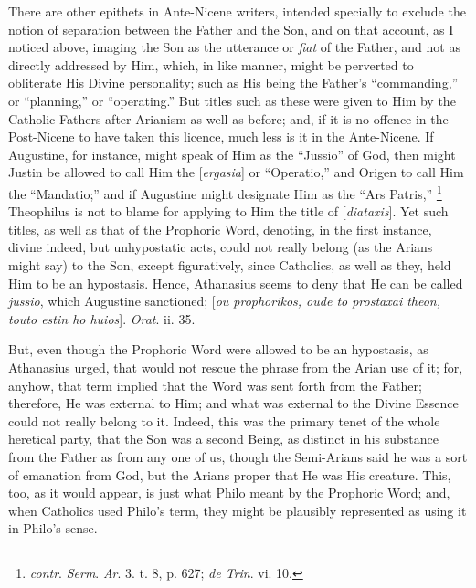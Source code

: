 There are other epithets in Ante-Nicene writers, intended specially
to exclude the notion of separation between the Father and the Son,
and on that account, as I noticed above, imaging the Son as the
utterance or \emph{fiat} of the Father, and not as directly addressed
by Him, which, in like manner, might be perverted to obliterate His
Divine personality; such as His being the Father's
``commanding,'' or ``planning,'' or
``operating.'' But titles such as these were given to Him by
the Catholic Fathers after Arianism as well as before; and, if it is
no offence in the Post-Nicene to have taken this licence, much less is
it in the Ante-Nicene. If Augustine, for instance, might speak of Him
as the ``Jussio'' of God, then might Justin be allowed to call
Him the [\emph{ergasia}] or ``Operatio,'' and Origen to call
Him the ``Mandatio;'' and if Augustine might designate Him as
the ``Ars Patris,'' \footnote{\emph{contr}. \emph{Serm}.
\emph{Ar}. 3. t. 8, p. 627; \emph{de Trin}. vi. 10.}
Theophilus is not to blame for applying to Him the title of [\emph{diataxis}].
Yet such titles, as well as that of the Prophoric Word, denoting, in
the first instance, divine indeed, but unhypostatic acts, could not
really belong (as the Arians might say) to the Son, except
figuratively, since Catholics, as well as they, held Him to be an
hypostasis. Hence, Athanasius seems to deny that He can be called \emph{jussio},
which Augustine sanctioned; [\emph{ou prophorikos, oude to prostaxai
theon, touto estin ho huios}]. \emph{Orat}. ii. 35.

But, even though the Prophoric Word were allowed to be an
hypostasis, as Athanasius urged, that would not rescue the phrase from
the Arian use of it; for, anyhow, that term implied that the Word was
sent forth from the Father; therefore, He was external to Him; and
what was external to the Divine Essence could not really belong to it.
Indeed, this was the primary tenet of the whole heretical party, that
the Son was a second Being, as distinct in his substance from the
Father as from any one of us, though the Semi-Arians said he was a
sort of emanation from God, but the Arians proper that He was His
creature. This, too, as it would appear, is just what Philo meant by
the Prophoric Word; and, when Catholics used Philo's term, they might
be plausibly represented as using it in Philo's sense.

